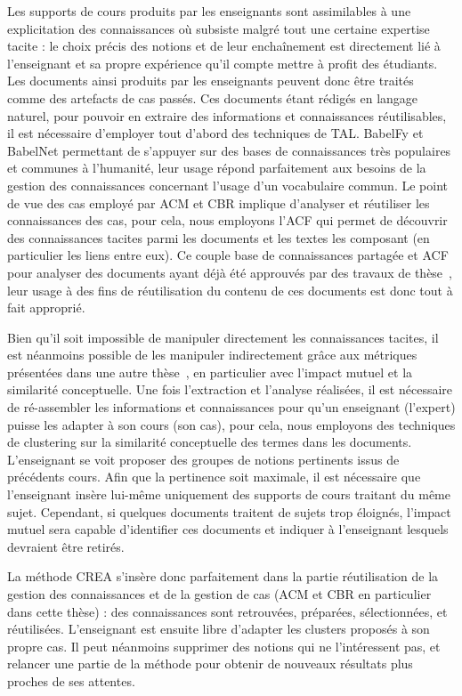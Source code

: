 Les supports de cours produits par les enseignants sont assimilables à une explicitation des connaissances où subsiste malgré tout une certaine expertise tacite : le choix précis des notions et de leur enchaînement est directement lié à l'enseignant et sa propre expérience qu'il compte mettre à profit des étudiants.
Les documents ainsi produits par les enseignants peuvent donc être traités comme des artefacts de cas passés.
Ces documents étant rédigés en langage naturel, pour pouvoir en extraire des informations et connaissances réutilisables, il est nécessaire d'employer tout d'abord des techniques de TAL.
BabelFy et BabelNet permettant de s'appuyer sur des bases de connaissances très populaires et communes à l'humanité, leur usage répond parfaitement aux besoins de la gestion des connaissances concernant l'usage d'un vocabulaire commun.
Le point de vue des cas employé par ACM et CBR implique d'analyser et réutiliser les connaissances des cas, pour cela, nous employons l'ACF qui permet de découvrir des connaissances tacites parmi les documents et les textes les composant (en particulier les liens entre eux).
Ce couple base de connaissances partagée et ACF pour analyser des documents ayant déjà été approuvés par des travaux de thèse~\cite{tang2016interactive}, leur usage à des fins de réutilisation du contenu de ces documents est donc tout à fait approprié.

Bien qu'il soit impossible de manipuler directement les connaissances tacites, il est néanmoins possible de les manipuler indirectement grâce aux métriques présentées dans une autre thèse~\cite{jaffal2019aide}, en particulier avec l'impact mutuel et la similarité conceptuelle.
Une fois l'extraction et l'analyse réalisées, il est nécessaire de ré-assembler les informations et connaissances pour qu'un enseignant (l'expert) puisse les adapter à son cours (son cas), pour cela, nous employons des techniques de clustering sur la similarité conceptuelle des termes dans les documents.
L'enseignant se voit proposer des groupes de notions pertinents issus de précédents cours.
Afin que la pertinence soit maximale, il est nécessaire que l'enseignant insère lui-même uniquement des supports de cours traitant du même sujet.
Cependant, si quelques documents traitent de sujets trop éloignés, l'impact mutuel sera capable d'identifier ces documents et indiquer à l'enseignant lesquels devraient être retirés.

\bigskip

La méthode CREA s'insère donc parfaitement dans la partie réutilisation de la gestion des connaissances et de la gestion de cas (ACM et CBR en particulier dans cette thèse) : des connaissances sont retrouvées, préparées, sélectionnées, et réutilisées.
L'enseignant est ensuite libre d'adapter les clusters proposés à son propre cas.
Il peut néanmoins supprimer des notions qui ne l'intéressent pas, et relancer une partie de la méthode pour obtenir de nouveaux résultats plus proches de ses attentes.

